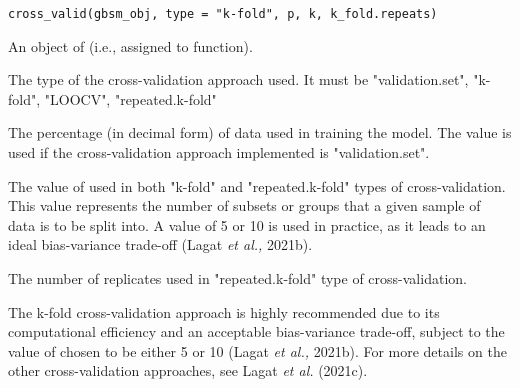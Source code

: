 \documentclass[a4paper]{book}
\begin{document}
%
\begin{Usage}
\begin{verbatim}
cross_valid(gbsm_obj, type = "k-fold", p, k, k_fold.repeats)
\end{verbatim}
\end{Usage}
%
\begin{Arguments}
\begin{ldescription}
\item[\code{gbsm\_obj}] An object of   (i.e., assigned to  function).

\item[\code{type}] The type of the cross-validation approach used. It must be
\eqn{\in \{}{}"validation.set", "k-fold", "LOOCV", "repeated.k-fold" \eqn{\}}{}

\item[\code{p}] The percentage (in decimal form) of data used in training the model. The value is used if the
cross-validation approach implemented is "validation.set".

\item[\code{k}] The value of  used in both "k-fold" and "repeated.k-fold" types of
cross-validation. This value represents the number of subsets or groups that a
given sample of data is to be split into. A value of 5 or 10 is used in practice,
as it leads to an ideal bias-variance trade-off (Lagat \emph{et al.,} 2021b).

\item[\code{k\_fold.repeats}] The number of replicates used in "repeated.k-fold" type of
cross-validation.
\end{ldescription}
\end{Arguments}
%
\begin{Details}\relax
The k-fold cross-validation approach is highly recommended due to its computational
efficiency and an acceptable bias-variance trade-off, subject to the value of 
chosen to be either 5 or 10 (Lagat \emph{et al.,} 2021b). For more details on the other
cross-validation approaches, see Lagat \emph{et al.} (2021c).
\end{Details}
%
\end{document}
